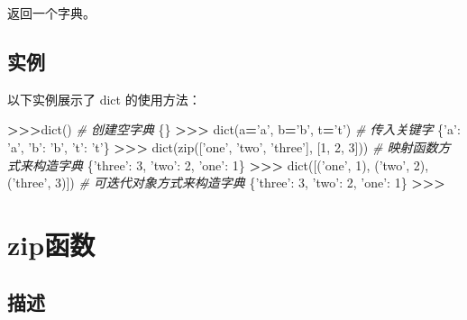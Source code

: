 \documentclass[]{ctexbook}
\newenvironment{Shaded}{\begin{snugshade}}{\end{snugshade}}
\newcommand{\BuiltInTok}[1]{#1}
\newcommand{\CommentTok}[1]{\textcolor[rgb]{0.56,0.35,0.01}{\textit{#1}}}
\newcommand{\DecValTok}[1]{\textcolor[rgb]{0.00,0.00,0.81}{#1}}
\newcommand{\NormalTok}[1]{#1}
\newcommand{\OperatorTok}[1]{\textcolor[rgb]{0.81,0.36,0.00}{\textbf{#1}}}
\newcommand{\StringTok}[1]{\textcolor[rgb]{0.31,0.60,0.02}{#1}}
\begin{document}
返回一个字典。

\hypertarget{ux5b9eux4f8b}{%
\subsection{实例}\label{ux5b9eux4f8b}}

以下实例展示了 dict 的使用方法：

\begin{Shaded}
\begin{Highlighting}[]
\OperatorTok{>>>}\BuiltInTok{dict}\NormalTok{()                        }\CommentTok{# 创建空字典}
\NormalTok{\{\}}
\OperatorTok{>>>} \BuiltInTok{dict}\NormalTok{(a}\OperatorTok{=}\StringTok{'a'}\NormalTok{, b}\OperatorTok{=}\StringTok{'b'}\NormalTok{, t}\OperatorTok{=}\StringTok{'t'}\NormalTok{)     }\CommentTok{# 传入关键字}
\NormalTok{\{}\StringTok{'a'}\NormalTok{: }\StringTok{'a'}\NormalTok{, }\StringTok{'b'}\NormalTok{: }\StringTok{'b'}\NormalTok{, }\StringTok{'t'}\NormalTok{: }\StringTok{'t'}\NormalTok{\}}
\OperatorTok{>>>} \BuiltInTok{dict}\NormalTok{(}\BuiltInTok{zip}\NormalTok{([}\StringTok{'one'}\NormalTok{, }\StringTok{'two'}\NormalTok{, }\StringTok{'three'}\NormalTok{], [}\DecValTok{1}\NormalTok{, }\DecValTok{2}\NormalTok{, }\DecValTok{3}\NormalTok{]))   }\CommentTok{# 映射函数方式来构造字典}
\NormalTok{\{}\StringTok{'three'}\NormalTok{: }\DecValTok{3}\NormalTok{, }\StringTok{'two'}\NormalTok{: }\DecValTok{2}\NormalTok{, }\StringTok{'one'}\NormalTok{: }\DecValTok{1}\NormalTok{\}}
\OperatorTok{>>>} \BuiltInTok{dict}\NormalTok{([(}\StringTok{'one'}\NormalTok{, }\DecValTok{1}\NormalTok{), (}\StringTok{'two'}\NormalTok{, }\DecValTok{2}\NormalTok{), (}\StringTok{'three'}\NormalTok{, }\DecValTok{3}\NormalTok{)])    }\CommentTok{# 可迭代对象方式来构造字典}
\NormalTok{\{}\StringTok{'three'}\NormalTok{: }\DecValTok{3}\NormalTok{, }\StringTok{'two'}\NormalTok{: }\DecValTok{2}\NormalTok{, }\StringTok{'one'}\NormalTok{: }\DecValTok{1}\NormalTok{\}}
\OperatorTok{>>>}
\end{Highlighting}
\end{Shaded}

\hypertarget{zipux51fdux6570}{%
\section{zip函数}\label{zipux51fdux6570}}

\hypertarget{ux63cfux8ff0-1}{%
\subsection{描述}\label{ux63cfux8ff0-1}}
\end{document}
